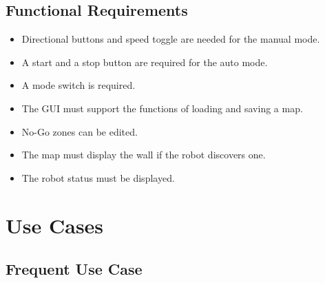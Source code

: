 \subsection{Functional Requirements}
\begin{itemize}
	\item Directional buttons and speed toggle are needed for the manual mode.
	\item A start and a stop button are required for the auto mode.
	\item A mode switch is required.
	\item The GUI must support the functions of loading and saving a map.
	\item No-Go zones can be edited.
	\item The map must display the wall if the robot discovers one.
	\item The robot status must be displayed.
\end{itemize}

\section{Use Cases}
\subsection{Frequent Use Case}
